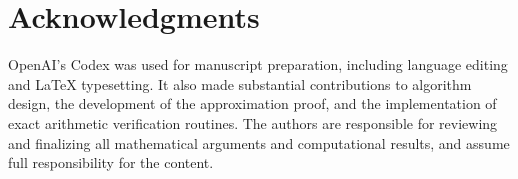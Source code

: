 \documentclass[11pt]{article}
\theoremstyle{remark}
\theoremstyle{plain}
\begin{document}
\section*{Acknowledgments}

OpenAI's Codex was used for manuscript preparation, including language
editing and \LaTeX{} typesetting. It also made substantial contributions
to algorithm design, the development of the approximation proof, and
the implementation of exact arithmetic verification routines. The
authors are responsible for reviewing and finalizing all mathematical
arguments and computational results, and assume full responsibility
for the content.

\end{document}
